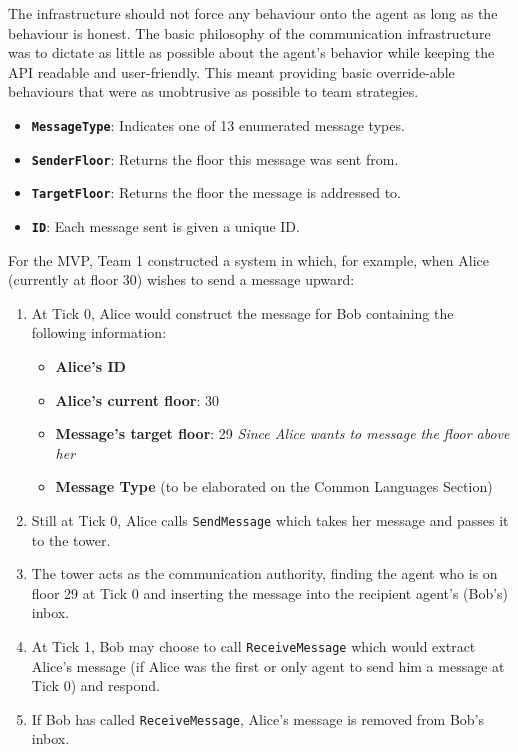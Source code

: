 The infrastructure should not force any behaviour onto the agent as long as the behaviour is honest. The basic philosophy of the communication infrastructure was to dictate as little as possible about the agent's behavior while keeping the API readable and user-friendly. This meant providing basic override-able behaviours that were as unobtrusive as possible to team strategies. \newline
\begin{itemize}
    \item \textbf{\texttt{MessageType}}: Indicates one of 13 enumerated message types.
    \item \textbf{\texttt{SenderFloor}}: Returns the floor this message was sent from.
    \item \textbf{\texttt{TargetFloor}}: Returns the floor the message is addressed to.
    \item \textbf{\texttt{ID}}: Each message sent is given a unique ID.
\end{itemize}
\vspace{\baselineskip}
For the MVP, Team 1 constructed a system in which, for example, when Alice (currently at floor 30) wishes to send a message upward:
\begin{enumerate}
    \item At Tick 0, Alice would construct the message for Bob containing the following information:
        \begin{itemize}
            \item \textbf{Alice's ID}
            \item \textbf{Alice's current floor}: 30
            \item \textbf{Message's target floor}: 29 \textit{Since Alice wants to message the floor above her}
            \item \textbf{Message Type} (to be elaborated on the Common Languages Section)
        \end{itemize}
    \item Still at Tick 0, Alice calls \texttt{SendMessage} which takes her message and passes it to the tower.
    \item The tower acts as the communication authority, finding the agent who is on floor 29 at Tick 0 and inserting the message into the recipient agent's (Bob's) inbox.
    \item At Tick 1, Bob may choose to call \texttt{ReceiveMessage} which would extract Alice's message (if Alice was the first or only agent to send him a message at Tick 0) and respond.
    \item If Bob has called \texttt{ReceiveMessage}, Alice's message is removed from Bob's inbox.
\end{enumerate}
